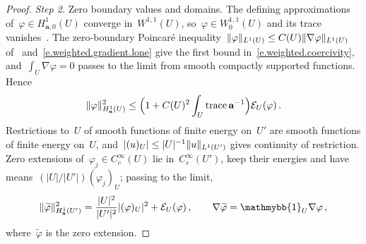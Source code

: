 \documentclass[11pt,letterpaper]{article}
\numberwithin{equation}{section}
\theoremstyle{definition}
\renewcommand{\a}{\mathbf{a}}
\newcommand*{\tr}{\mathrm{trace\,}}
\DeclarePairedDelimiter{\norm}{\lVert}{\rVert}
\newcommand{\indc}{{\mathmybb{1}}}
\newcommand{\Ener}{\mathcal E}
\newcommand{\Hzero}[1]{H^1_{#1,0}}
\begin{document}
\begin{proof}
\emph{Step 2.} Zero boundary values and domains. The defining approximations of~$\varphi\in\Hzero{\a}(U)$ converge in~$W^{1,1}(U)$, so~$\varphi\in W^{1,1}_0(U)$ and its trace vanishes~\cite[Theorem 3.10]{Guermond.traces}. The zero-boundary Poincar\'e inequality~$\norm{\varphi}_{L^1(U)}\leq C(U)\norm{\nabla\varphi}_{L^1(U)}$ of~\cite[Lemma 3.27]{Guermond.traces} and~\eqref{e.weighted.gradient.lone} give the first bound in~\eqref{e.weighted.coercivity}, and~$\int_U\nabla\varphi=0$ passes to the limit from smooth compactly supported functions. Hence
\begin{equation*}
	\norm{\varphi}_{H^1_\a(U)}^2\leq\Bigl(1+C(U)^2\int_U\tr\a^{-1}\Bigr)\Ener_U(\varphi)\,.
\end{equation*}
Restrictions to~$U$ of smooth functions of finite energy on~$U'$ are smooth functions of finite energy on~$U$, and~$|(u)_U|\leq|U|^{-1}\norm{u}_{L^1(U')}$ gives continuity of restriction. Zero extensions of~$\varphi_j\in C^\infty_c(U)$ lie in~$C^\infty_c(U')$, keep their energies and have means~$(|U|/|U'|)(\varphi_j)_U$; passing to the limit,
\begin{equation}
	\norm{\widetilde\varphi}_{H^1_\a(U')}^2=\frac{|U|^2}{|U'|^2}|(\varphi)_U|^2+\Ener_U(\varphi)\,,\qquad \nabla\widetilde\varphi=\indc_U\nabla\varphi\,,
	\label{e.weighted.zero.extension}
\end{equation}
where~$\widetilde\varphi$ is the zero extension.

\smallskip


\end{proof}
\end{document}
